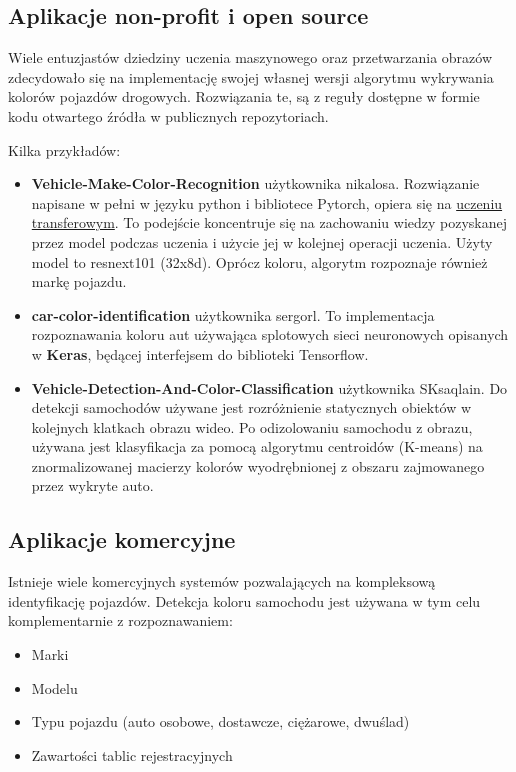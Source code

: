 \pagebreak

\subsection{Aplikacje non-profit i open source}
Wiele entuzjastów dziedziny uczenia maszynowego oraz przetwarzania obrazów zdecydowało się na implementację swojej własnej wersji algorytmu wykrywania kolorów pojazdów drogowych. Rozwiązania te, są z reguły dostępne w formie kodu otwartego źródła w publicznych repozytoriach.

Kilka przykładów:
\begin{itemize}
    \item \textbf{Vehicle-Make-Color-Recognition} użytkownika nikalosa. Rozwiązanie napisane w pełni w języku python i bibliotece Pytorch, opiera się na \underline{uczeniu transferowym}. To podejście koncentruje się na zachowaniu wiedzy pozyskanej przez model podczas uczenia i użycie jej w kolejnej operacji uczenia. Użyty model to resnext101 (32x8d). Oprócz koloru, algorytm rozpoznaje również markę pojazdu. \cite{nikalosa}
    
    \item \textbf{car-color-identification} użytkownika sergorl. To implementacja rozpoznawania koloru aut używająca splotowych sieci neuronowych opisanych w \textbf{Keras}, będącej interfejsem do biblioteki Tensorflow. \cite{sergorl}
    
    \pagebreak
    
    \item \textbf{Vehicle-Detection-And-Color-Classification} użytkownika SKsaqlain. Do detekcji samochodów używane jest rozróżnienie statycznych obiektów w kolejnych klatkach obrazu wideo. Po odizolowaniu samochodu z obrazu, używana jest klasyfikacja za pomocą algorytmu centroidów (K-means) na znormalizowanej macierzy kolorów wyodrębnionej z obszaru zajmowanego przez wykryte auto. \cite{saqlain}
\end{itemize}

\subsection{Aplikacje komercyjne}
Istnieje wiele komercyjnych systemów pozwalających na kompleksową identyfikację pojazdów. 
Detekcja koloru samochodu jest używana w tym celu komplementarnie z rozpoznawaniem:
\begin{itemize}
    \item Marki
    \item Modelu
    \item Typu pojazdu (auto osobowe, dostawcze, ciężarowe, dwuślad)
    \item Zawartości tablic rejestracyjnych
\end{itemize}

